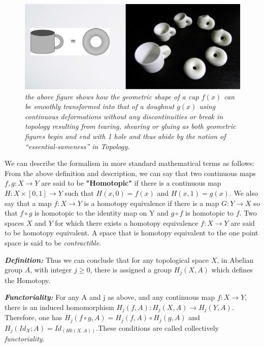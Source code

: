 \begin{figure}
	\centering
	\includegraphics[width=\linewidth]{images/02_Homotopy cup doughnut.jpg}
	\caption{\textit{the above figure shows how the geometric shape of a cup $f(x)$ can be smoothly transformed into that of a doughnut $g(x)$ using continuous deformations without any discontinuities or break in topology resulting from tearing, shearing or gluing as both geometric figures begin and end with 1 hole and thus abide by the notion of “essential-sameness” in Topology. }}
	\label{fig:Homotopy}
\end{figure}

We can describe the formalism in more standard mathematical terms as follows: From the above definition and description, we can say that two continuous maps $f, g : X \rightarrow Y$ are said to be \textbf{"Homotopic"} if there is a continuous map  $H :X \times [0, 1] \rightarrow Y$ such that $H(x, 0) = f(x)$ and $H(x, 1) = g(x)$. We also say that a map $f : X \rightarrow Y$ is a homotopy equivalence if there is a map $G : Y \rightarrow X$ so that $f \circ g$ is homotopic to the identity map on Y and $g \circ f$ is homotopic to $f$. Two spaces $X$ and $Y$ for which there exists a homotopy equivalence $f : X \rightarrow Y$ are said to be homotopy equivalent. A space that is homotopy equivalent to the one point space is said to be \textit{contractible}. \cite{07.1_Homotopy} \cite{07_bjorner2003Homotopy}

\textbf{\textit{Definition:}} Thus we can conclude that for any topological space $X$, in Abelian group $A$, with integer $j \ge 0$, there is assigned a group $H_j(X,A)$ which defines the Homotopy.

\textbf{\textit{Functoriality:}} For any A and j as above, and any continuous map $f : X \rightarrow Y$, there is an induced homomorphism $H_j(f,A) : H_j(X,A) \rightarrow H_j(Y,A)$. Therefore, one has $H_j(f \circ g,A) = H_j(f,A) \circ H_j(g,A)$ and $H_j(Id_X;A) = Id_(Hk(X,A))$.These conditions are called collectively \textit{functoriality}.\cite{05_mac2013Functoriality}

